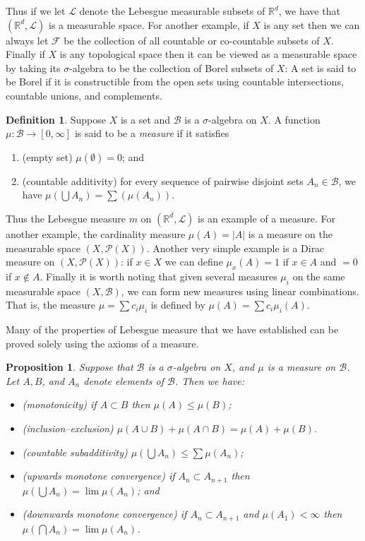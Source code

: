 \documentclass[11pt,oneside]{amsbook}
\newcommand{\RR}{{\mathbb R}}
\theoremstyle{definition}
\theoremstyle{plain}
\newtheorem{prop}[thm]{Proposition}
\theoremstyle{definition}
\newtheorem{defn}[thm]{Definition}
\theoremstyle{remark}
\numberwithin{equation}{section}
\numberwithin{figure}{section}
\begin{document}
Thus if we let $\mathcal L$ denote the Lebesgue measurable subsets of $\RR^d$, we have that $(\RR^d,\mathcal L)$ is a measurable space. For another example, if $X$ is any set then we can always let $\mathcal F$ be the collection of all countable or co-countable subsets of $X$. Finally if $X$ is any topological space then it can be viewed as a measurable space by taking its $\sigma$-algebra to be the collection of Borel subsets of $X$: A set is said to be Borel if it is constructible from the open sets using countable intersections, countable unions, and complements.

\begin{defn}
  Suppose $X$ is a set and $\mathcal B$ is a $\sigma$-algebra on $X$. A function $\mu\colon\mathcal B\to[0,\infty]$ is said to be a \emph{measure} if it satisfies
  \begin{enumerate}
  \item (empty set) $\mu(\emptyset)=0$; and
  \item (countable additivity) for every sequence of pairwise disjoint sets $A_n\in\mathcal B$, we have $\mu(\bigcup A_n)=\sum(\mu(A_n))$.
  \end{enumerate}
\end{defn}

Thus the Lebesgue measure $m$ on $(\RR^d,\mathcal L)$ is an example of a measure. For another example, the cardinality measure $\mu(A)=|A|$ is a measure on the measurable space $(X,\mathcal P(X))$. Another very simple example is a Dirac measure on $(X,\mathcal P(X))$: if $x\in X$ we can define $\mu_x(A)=1$ if $x\in A$ and $=0$ if $x\notin A$. Finally it is worth noting that given several measures $\mu_i$ on the same measurable space $(X,\mathcal B)$, we can form new measures using linear combinations. That is, the measure $\mu=\sum c_i\mu_i$ is defined by $\mu(A)=\sum c_i\mu_i(A)$.

Many of the properties of Lebesgue measure that we have established can be proved solely using the axioms of a measure.

\begin{prop}
  Suppose that $\mathcal B$ is a $\sigma$-algebra on $X$, and $\mu$ is a measure on $\mathcal B$. Let $A,B$, and $A_n$ denote elements of $\mathcal B$. Then we have:
  \begin{itemize}
    \item (monotonicity) if $A\subset B$ then $\mu(A)\leq\mu(B)$;
    \item (inclusion--exclusion) $\mu(A\cup B)+\mu(A\cap B)=\mu(A)+\mu(B)$.
    \item (countable subadditivity) $\mu(\bigcup A_n)\leq\sum\mu(A_n)$;
    \item (upwards monotone convergence) if $A_n\subset A_{n+1}$ then $\mu(\bigcup A_n)=\lim\mu(A_n)$; and
    \item (downwards monotone convergence) if $A_n\subset A_{n+1}$ and $\mu(A_1)<\infty$ then $\mu(\bigcap A_n)=\lim\mu(A_n)$.
  \end{itemize}
\end{prop}
\end{document}
